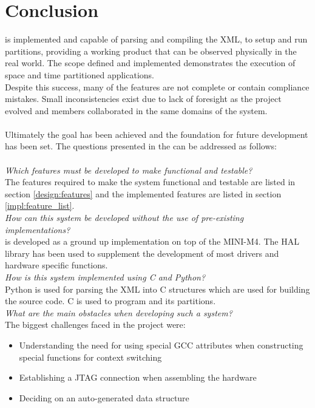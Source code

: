 \chapter{Conclusion}
\OSname{} is implemented and capable of parsing and
compiling the XML, to setup and run partitions, providing
a working product that can be observed physically in the real world.
The scope defined and implemented demonstrates the
execution of space and time partitioned applications.
\\
Despite this success, many of the features are not
complete or contain compliance mistakes.
Small inconsistencies exist due to lack of foresight
as the project evolved and members collaborated
in the same domains of the system.
\\\\
Ultimately the goal has been achieved and the
foundation for future development has been set.
The questions presented in the  can be addressed as follows:
\\\\
\textit{Which features must be developed to make \OSname{} functional and
testable?}\\
The features required to make the system functional and testable are listed in  section \ref{design:features}
and the implemented features are listed in section \ref{impl:feature_list}.\\

\textit{How can this system be developed without the use of pre-existing
implementations?}\\
\OSname{} is developed as a ground up implementation on top of the MINI-M4.
The HAL library has been used to supplement the development of most drivers and hardware specific functions.\\

\textit{How is this system implemented using C and Python?}\\
Python is used for parsing the XML into C structures which are used for building the source code.
C is used to program \OSname{} and its partitions.\\

\textit{What are the main obstacles when developing such a system?}\\
The biggest challenges faced in the project were:
\begin{itemize}
	\item Understanding the need for using special GCC attributes when constructing special functions for context switching
	\item Establishing a JTAG connection when assembling the hardware
	\item Deciding on an auto-generated data structure
\end{itemize}

